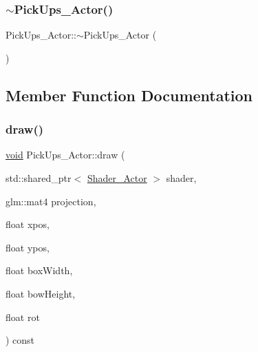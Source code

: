 \subsubsection{\texorpdfstring{$\sim$\+Pick\+Ups\+\_\+\+Actor()}{~PickUps\_Actor()}}
{\footnotesize\ttfamily Pick\+Ups\+\_\+\+Actor\+::$\sim$\+Pick\+Ups\+\_\+\+Actor (\begin{DoxyParamCaption}{ }\end{DoxyParamCaption})}



\subsection{Member Function Documentation}
\mbox{\label{classPickUps__Actor_a4e3094c5847d4b712718a04839fce966}} 
\subsubsection{\texorpdfstring{draw()}{draw()}\hspace{0.1cm}{\footnotesize\ttfamily [1/2]}}
{\footnotesize\ttfamily \hyperlink{imgui__impl__opengl3__loader_8h_ac668e7cffd9e2e9cfee428b9b2f34fa7}{void} Pick\+Ups\+\_\+\+Actor\+::draw (\begin{DoxyParamCaption}\item[{std\+::shared\+\_\+ptr$<$ \hyperlink{classShader__Actor}{Shader\+\_\+\+Actor} $>$}]{shader,  }\item[{glm\+::mat4}]{projection,  }\item[{float}]{xpos,  }\item[{float}]{ypos,  }\item[{float}]{box\+Width,  }\item[{float}]{bow\+Height,  }\item[{float}]{rot }\end{DoxyParamCaption}) const}

\mbox{\label{classPickUps__Actor_ae710e2745950c1b868aba96f7a19637f}} 
